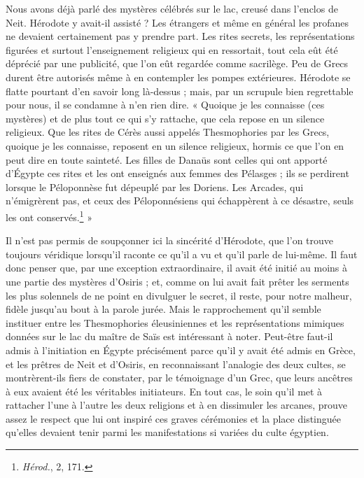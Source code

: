 \documentclass[a4paper, 11pt, oneside]{article}
\begin{document}
Nous avons déjà parlé des mystères célébrés sur le lac, creusé dans l'enclos de Neit. Hérodote y avait-il assisté ? Les étrangers et même en général les profanes ne devaient certainement pas y prendre part. Les rites secrets, les représentations figurées et surtout l'enseignement religieux qui en ressortait, tout cela eût été déprécié par une publicité, que l'on eût regardée comme sacrilège. Peu de Grecs durent être autorisés même à en contempler les pompes extérieures. Hérodote se flatte pourtant d'en savoir long là-dessus ; mais, par un scrupule bien regrettable pour nous, il se condamne à n'en rien dire. « Quoique je les connaisse (ces mystères) et de plus tout ce qui s'y rattache, que cela repose en un silence religieux. Que les rites de Cérès aussi appelés Thesmophories par les Grecs, quoique je les connaisse, reposent en un silence religieux, hormis ce que l'on en peut dire en toute sainteté. Les filles de Danaüs sont celles qui ont apporté d'Égypte ces rites et les ont enseignés aux femmes des Pélasges ; ils se perdirent lorsque le Péloponnèse fut dépeuplé par les Doriens. Les Arcades, qui n'émigrèrent pas, et ceux des Péloponnésiens qui échappèrent à ce désastre, seuls les ont conservés.\footnote{\emph{Hérod.}, 2, 171.} »

Il n'est pas permis de soupçonner ici la sincérité d'Hérodote, que l'on trouve toujours véridique lorsqu'il raconte ce qu'il a vu et qu'il parle de lui-même. Il faut donc penser que, par une exception extraordinaire, il avait été initié au moins à une partie des mystères d'Osiris ; et, comme on lui avait fait prêter les serments les plus solennels de ne point en divulguer le secret, il reste, pour notre malheur, fidèle jusqu'au bout à la parole jurée. Mais le rapprochement qu'il semble instituer entre les Thesmophories éleusiniennes et les représentations mimiques données sur le lac du maître de Saïs est intéressant à noter. Peut-être faut-il admis à l'initiation en Égypte précisément parce qu’il y avait été admis en Grèce, et les prêtres de Neit et d'Osiris, en reconnaissant l'analogie des deux cultes, se montrèrent-ils fiers de constater, par le témoignage d'un Grec, que leurs ancêtres à eux avaient été les véritables initiateurs. En tout cas, le soin qu'il met à rattacher l'une à l'autre les deux religions et à en dissimuler les arcanes, prouve assez le respect que lui ont inspiré ces graves cérémonies et la place distinguée qu'elles devaient tenir parmi les manifestations si variées du culte égyptien.
\end{document}
